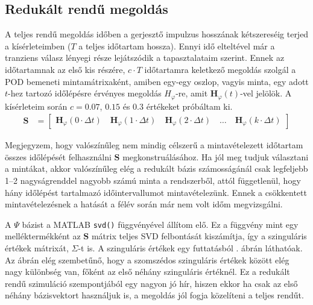         \subsection{Redukált rendű megoldás}
            A teljes rendű megoldás időben a gerjesztő impulzus hosszának kétszereséig terjed a kísérleteimben ($T$ a teljes időtartam hossza). Ennyi idő elteltével már a tranziens válasz lényegi része lejátszódik a tapasztalataim szerint. Ennek az időtartamnak az első kis részére, $c\cdot T$ időtartamra keletkező megoldás szolgál a POD bemeneti mintamátrixaként, amiben egy-egy oszlop, vagyis minta, egy adott $t$-hez tartozó időlépésre érvényes megoldás $H_{\varphi}$-re, amit $\textbf{H}_{\varphi}(t)$-vel jelölök. A kísérleteim során $c=0.07$, $0.15$ és $0.3$ értékeket próbáltam ki.
            \begin{equation}\label{equ:minta}
                \begin{aligned}
                    \textbf{S} &= \begin{bmatrix}
                        \textbf{H}_{\varphi}(0\cdot\Delta t)\quad
                        \textbf{H}_{\varphi}(1\cdot\Delta t)\quad
                        \textbf{H}_{\varphi}(2\cdot\Delta t)\quad
                        \hdots\quad
                        \textbf{H}_{\varphi}(k\cdot\Delta t) \end{bmatrix}
                \end{aligned}
            \end{equation}
            \par
            Megjegyzem, hogy valószínűleg nem mindig célszerű a mintavételezett időtartam összes időlépését felhasználni $\textbf{S}$ megkonstruálásához. Ha jól meg tudjuk választani a mintákat, akkor valószínűleg elég a redukált bázis számosságánál csak legfeljebb \qtyrange{1}{2}{} nagyságrenddel nagyobb számú minta a rendszerből, attól függetlenül, hogy hány időlépést tartalmazó időintervallumot mintavételezünk. Ennek a csökkentett mintavételezésnek a hatását a félév során már nem volt időm megvizsgálni.
            \par
            A $\Psi$ bázist a MATLAB \verb|svd()| függvényével állítom elő. Ez a függvény mint egy melléktermékként az $\textbf{S}$ mátrix teljes SVD felbontását kiszámítja, így a szinguláris értékek mátrixát, $\Sigma$-t is. A szinguláris értékek egy futtatásból . ábrán láthatóak. Az ábrán elég szembetűnő, hogy a szomszédos szinguláris értékek között elég nagy különbség van, főként az első néhány szinguláris értéknél. Ez a redukált rendű szimuláció szempontjából egy nagyon jó hír, hiszen ekkor ha csak az első néhány bázisvektort használjuk is, a megoldás jól fogja közelíteni a teljes rendűt.
